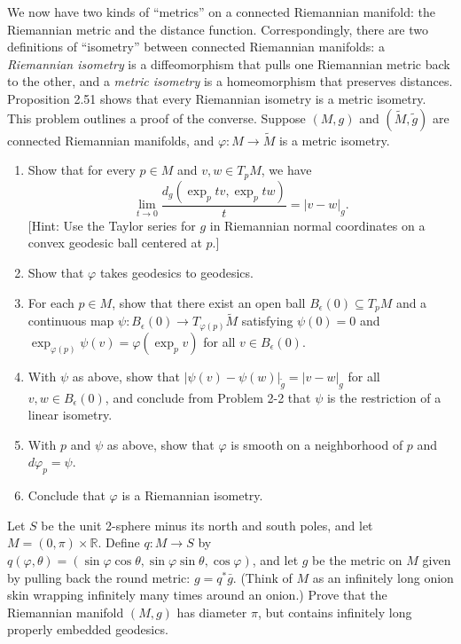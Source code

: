 \begin{exercise}
\label{prob:metric-isometry-characterization}
\label{prob:exponential-distance-limit}

We now have two kinds of ``metrics'' on a connected Riemannian manifold: the Riemannian metric and the distance function. Correspondingly, there are two definitions of ``isometry'' between connected Riemannian manifolds: a \emph{Riemannian isometry} is a diffeomorphism that pulls one Riemannian metric back to the other, and a \emph{metric isometry} is a homeomorphism that preserves distances. Proposition 2.51 shows that every Riemannian isometry is a metric isometry. This problem outlines a proof of the converse. Suppose $(M, g)$ and $(\tilde{M}, \tilde{g})$ are connected Riemannian manifolds, and $\varphi: M \to \tilde{M}$ is a metric isometry.
\begin{enumerate}
\item[(a)] Show that for every $p \in M$ and $v, w \in T_p M$, we have
\[
\lim_{t \to 0} \frac{d_g(\exp_p tv, \exp_p tw)}{t} = |v - w|_g.
\]
[Hint: Use the Taylor series for $g$ in Riemannian normal coordinates on a convex geodesic ball centered at $p$.]
\item[(b)] Show that $\varphi$ takes geodesics to geodesics.
\item[(c)] For each $p \in M$, show that there exist an open ball $B_\epsilon(0) \subseteq T_p M$ and a continuous map $\psi : B_\epsilon(0) \to T_{\varphi(p)} \tilde{M}$ satisfying $\psi(0) = 0$ and $\exp_{\varphi(p)} \psi(v) = \varphi(\exp_p v)$ for all $v \in B_\epsilon(0)$.
\item[(d)] With $\psi$ as above, show that $|\psi(v) - \psi(w)|_{\tilde{g}} = |v - w|_g$ for all $v, w \in B_\epsilon(0)$, and conclude from Problem 2-2 that $\psi$ is the restriction of a linear isometry.
\item[(e)] With $p$ and $\psi$ as above, show that $\varphi$ is smooth on a neighborhood of $p$ and $d\varphi_p = \psi$.
\item[(f)] Conclude that $\varphi$ is a Riemannian isometry.
\end{enumerate}
\end{exercise}

\begin{exercise}
\label{prob:onion-skin-geodesics}

Let $S$ be the unit 2-sphere minus its north and south poles, and let $M = (0, \pi) \times \mathbb{R}$. Define $q : M \to S$ by $q(\varphi, \theta) = (\sin \varphi \cos \theta, \sin \varphi \sin \theta, \cos \varphi)$, and let $g$ be the metric on $M$ given by pulling back the round metric: $g = q^* \bar{g}$. (Think of $M$ as an infinitely long onion skin wrapping infinitely many times around an onion.) Prove that the Riemannian manifold $(M, g)$ has diameter $\pi$, but contains infinitely long properly embedded geodesics.
\end{exercise}

